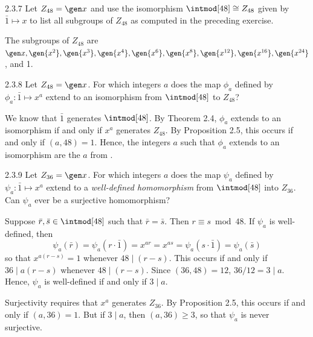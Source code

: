 \begin{exercise}{2.3.7}
    Let $Z_{48} = \gen x$ and use the isomorphism $\intmod[48] \cong Z_{48}$ given by $\bar 1 \mapsto x$ to list all subgroups of $Z_{48}$ as computed in the preceding exercise.
\end{exercise}

\begin{sol}
    The subgroups of $Z_{48}$ are $\gen x, \gen{x^2}, \gen {x^3}, \gen{x^4}, \gen{x^6}, \gen{x^8}, \gen{x^{12}}, \gen{x^{16}}, \gen{x^{24}}$, and 1.
\end{sol}

\begin{exercise}{2.3.8}
    Let $Z_{48} = \gen x$.
	For which integers $a$ does the map $\phi_a$ defined by $\phi_a : \bar 1 \mapsto x^a$ extend to an isomorphism from $\intmod[48]$ to $Z_{48}$?
\end{exercise}

\begin{sol}
    We know that $\bar 1$ generates $\intmod[48]$.
	By Theorem 2.4, $\phi_a$ extends to an isomorphism if and only if $x^a$ generates $Z_{48}$.
	By Proposition 2.5, this occurs if and only if $(a, 48) = 1$.
	Hence, the integers $a$ such that $\phi_a$ extends to an isomorphism are the $a$ from .
\end{sol}

\begin{exercise}{2.3.9}
    Let $Z_{36} = \gen x$.
	For which integers $a$ does the map $\psi_a$ defined by $\psi_a : \bar 1 \mapsto x^a$ extend to a \emph{well-defined homomorphism} from $\intmod[48]$ into $Z_{36}$.
	Can $\psi_a$ ever be a surjective homomorphism?
\end{exercise}

\begin{sol}
    Suppose $\bar r, \bar s \in \intmod[48]$ such that $\bar r = \bar s$.
	Then $r \equiv s \bmod 48$.
	If $\psi_a$ is well-defined, then
    \[
    	\psi_a(\bar r) = \psi_a(r \cdot \bar 1) = x^{a r} = x^{a s} = \psi_a(s \cdot \bar 1) = \psi_a(\bar s)
    \]
    so that $x^{a (r - s)} = 1$ whenever $48 \mid (r - s)$.
	This occurs if and only if $36 \mid a(r - s)$ whenever $48 \mid (r - s)$.
	Since $(36, 48) = 12$, $36/12 = 3 \mid a$.
	Hence, $\psi_a$ is well-defined if and only if $3 \mid a$.

    Surjectivity requires that $x^a$ generates $Z_{36}$.
	By Proposition 2.5, this occurs if and only if $(a, 36) = 1$.
	But if $3 \mid a$, then $(a, 36) \geq 3$, so that $\psi_a$ is never surjective.
\end{sol}

